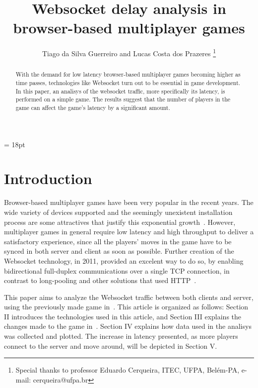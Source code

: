 \documentclass[english]{sbrt}
\begin{document}

\title{Websocket delay analysis in browser-based multiplayer games}

\author{Tiago da Silva Guerreiro and Lucas Costa dos Prazeres
  \thanks{Special thanks to professor Eduardo Cerqueira, ITEC, UFPA, Belém-PA, e-mail: cerqueira@ufpa.br}
}

\maketitle

\baselineskip = 18pt


\begin{abstract}
  With the demand for low latency browser-based multiplayer games becoming higher as time passes, technologies like Websocket turn out to be essential in game development. In this paper, an analisys of the websocket traffic, more specifically its latency, is performed on a simple game. The results suggest that the number of players in the game can affect the game's latency by a significant amount.
\end{abstract}

\begin{keywords}

\end{keywords}

\section{\textbf{Introduction}}
Browser-based multiplayer games have been very popular in the recent years. The wide variety of devices supported and the seemingly unexistent installation process are some attractives that justify this exponential growth~\cite{chen2011framework}. However, multiplayer games in general require low latency and high throughput to deliver a satisfactory experience, since all the players' moves in the game have to be synced in both server and client as soon as possible. Further creation of the Websocket technology, in 2011, provided an excelent way to do so, by enabling bidirectional full-duplex communications over a single TCP connection, in contrast to long-pooling and other solutions that used HTTP~\cite{liu2012research}.

This paper aims to analyze the Websocket traffic between both clients and server, using the previously made game in~\cite{previous}. This article is organized as follows: Section II introduces the technologies used in this article, and Section III explains the changes made to the game in~\cite{previous}. Section IV explains how data used in the analisys was collected and plotted. The increase in latency presented, as more players connect to the server and move around, will be depicted in Section V.
\end{document}
